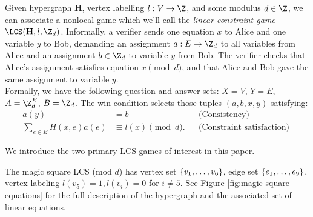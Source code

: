 \begin{definition}\label{definition:linear-constraint-game}
	Given hypergraph $\mathbf H$, vertex labelling $l: V \to \Z$, and some modulus $d\in \Z$, we can associate a nonlocal game which we'll call the \emph{linear constraint game} $\LCS(\mathbf H, l, \Z_d)$. Informally, a verifier sends one equation $x$ to Alice and one variable $y$ to Bob, demanding an assignment $a:E\to \Z_d$ to all variables from Alice and an assignment $b\in \Z_d$ to variable $y$ from Bob. The verifier checks that Alice's assignment satisfies equation $x \pmod d$, and that Alice and Bob gave the same assignment to variable $y$.
	\\\noindent
	Formally, we have the following question and answer sets: $X = V$, $Y = E$, $A = \Z_d^E$, $B = \Z_d$. The win condition selects those tuples $(a,b,x,y)$ satisfying:
	\begin{align}
	\label{eq:lcs-equation}
		a(y) &= b &&\text{(Consistency) }
	\\	\sum_{e\in E} H(x,e)a(e) &\equiv l(x) \pmod d.	&&\text{(Constraint satisfaction) }
	\end{align}
\end{definition}
We introduce the two primary LCS games of interest in this paper.
\begin{example}
\label{example:magic-square}
	The magic square LCS (mod $d$) has vertex set $\left\{v_1,\ldots, v_6\right\}$, edge set $\left\{e_1,\ldots, e_9\right\}$, vertex labeling $l(v_5) = 1, l(v_i) = 0$ for $i\neq 5$. See Figure \ref{fig:magic-square-equations} for the full description of the hypergraph and the associated set of linear equations.
	
\end{example}
